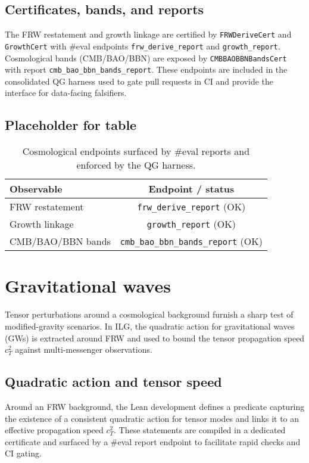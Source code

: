 \documentclass[aps,prd,twocolumn,superscriptaddress,nofootinbib,floatfix,longbibliography]{revtex4-2}
\newcommand{\lean}[1]{\texttt{#1}}
\begin{document}
\subsection{Certificates, bands, and reports}
The FRW restatement and growth linkage are certified by \lean{FRWDeriveCert} and \lean{GrowthCert} with \#eval endpoints \lean{frw_derive_report} and \lean{growth_report}. Cosmological bands (CMB/BAO/BBN) are exposed by \lean{CMBBAOBBNBandsCert} with report \lean{cmb_bao_bbn_bands_report}. These endpoints are included in the consolidated QG harness used to gate pull requests in CI and provide the interface for data-facing falsifiers.

\subsection{Placeholder for table}
\begin{table}[t]
  \centering
  \begin{tabular}{l c}
    \toprule
    Observable & Endpoint / status \\
    \midrule
    FRW restatement & \texttt{frw\_derive\_report} (OK) \\
    Growth linkage & \texttt{growth\_report} (OK) \\
    CMB/BAO/BBN bands & \texttt{cmb\_bao\_bbn\_bands\_report} (OK) \\
    \bottomrule
  \end{tabular}
  \caption{Cosmological endpoints surfaced by \#eval reports and enforced by the QG harness.}
  \label{tab:frw-endpoints}
\end{table}

\section{Gravitational waves}\label{sec:gw}

Tensor perturbations around a cosmological background furnish a sharp test of modified-gravity scenarios. In ILG, the quadratic action for gravitational waves (GWs) is extracted around FRW and used to bound the tensor propagation speed $c_T^2$ against multi-messenger observations.

\subsection{Quadratic action and tensor speed}
Around an FRW background, the Lean development defines a predicate capturing the existence of a consistent quadratic action for tensor modes and links it to an effective propagation speed $c_T^2$. These statements are compiled in a dedicated certificate and surfaced by a \#eval report endpoint to facilitate rapid checks and CI gating.
\end{document}

